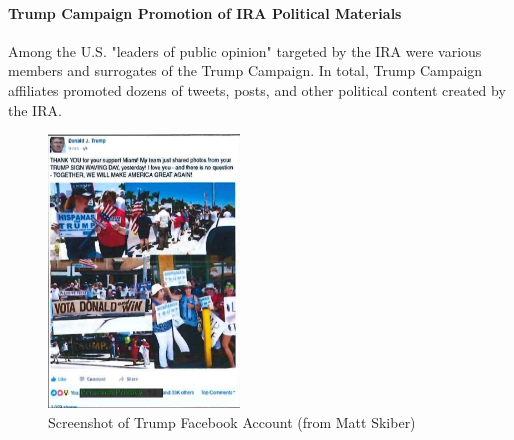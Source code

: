 \paragraph{Trump Campaign Promotion of IRA Political Materials}

Among the U.S. "leaders of public opinion" targeted by the IRA were various members and surrogates of the Trump Campaign.
In total, Trump Campaign affiliates promoted dozens of tweets, posts, and other political content created by the IRA.

\begin{figure}
    \vspace{-20pt}
    \begin{center}
        \includegraphics[width=2in]{images/p-34-trump-facebook.png}%
    \end{center}
    \vspace{-20pt}
    \caption*{Screenshot of Trump Facebook Account (from Matt Skiber)}
    \vspace{-10pt}
    \label{fig:trump-facebook}
\end{figure}

